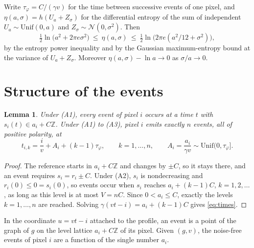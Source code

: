 \documentclass[10pt]{article}
\newtheorem{lemma}{Lemma}
\theoremstyle{remark}
\newcommand{\tphi}{\tau_\varphi}
\begin{document}
\noindent Write $\tphi=C/(\gamma v)$ for the time between successive events of one pixel, and
$\eta(a,\sigma)=h(U_a+Z_\sigma)$ for the differential entropy of the sum of independent
$U_a\sim\mathrm{Unif}(0,a)$ and $Z_\sigma\sim\mathcal N(0,\sigma^2)$. Then
\begin{equation}\label{eq:eta}
  \tfrac12\ln\!\big(a^2+2\pi e\sigma^2\big)\ \le\ \eta(a,\sigma)\ \le\ \tfrac12\ln\!\big(2\pi e(a^2/12+\sigma^2)\big),
\end{equation}
by the entropy power inequality and by the Gaussian maximum-entropy bound at the variance of
$U_a+Z_\sigma$. Moreover $\eta(a,\sigma)-\ln a\to 0$ as $\sigma/a\to 0$.

\section{Structure of the events}
\begin{lemma}\label{lem:levels}
Under (A1), every event of pixel $i$ occurs at a time $t$ with $s_i(t)\in a_i+C\mathbb Z$. Under
(A1) to (A3), pixel $i$ emits exactly $n$ events, all of positive polarity, at
\begin{equation}\label{eq:times}
  t_{i,k}=\frac{i}{v}+A_i+(k-1)\tphi,\qquad k=1,\dots,n,\qquad A_i=\frac{a_i}{\gamma v}\sim\mathrm{Unif}(0,\tphi].
\end{equation}
\end{lemma}
\begin{proof}
The reference starts in $a_i+C\mathbb Z$ and changes by $\pm C$, so it stays there, and an event
requires $s_i=r_i\pm C$. Under (A2), $s_i$ is nondecreasing and $r_i(0)\le 0=s_i(0)$, so events
occur when $s_i$ reaches $a_i+(k-1)C$, $k=1,2,\dots$, as long as this level is at most $V=nC$.
Since $0<a_i\le C$, exactly the levels $k=1,\dots,n$ are reached. Solving
$\gamma(vt-i)=a_i+(k-1)C$ gives \eqref{eq:times}.
\end{proof}
In the coordinate $u=vt-i$ attached to the profile, an event is a point of the graph of $g$ on the
level lattice $a_i+C\mathbb Z$ of its pixel. Given $(g,v)$, the noise-free events of pixel $i$ are
a function of the single number $a_i$.
\end{document}
